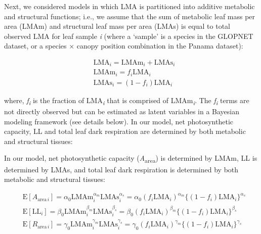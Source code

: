 \documentclass[
  12pt,
]{article}
\begin{document}
Next, we considered models in which LMA is partitioned into additive metabolic and structural functions; i.e., we assume that the sum of metabolic leaf mass per area (LMAm) and structural leaf mass per area (LMAs) is equal to total observed LMA for leaf sample \emph{i} (where a `sample' is a species in the GLOPNET dataset, or a species × canopy position combination in the Panama dataset):

\begin{align}
  &\mathrm{LMA}_{i} =\mathrm{LMAm}_{i} + \mathrm{LMAs}_{i} \label{eq:LMA}\\
  &\mathrm{LMAm}_{i} = f_{i} \mathrm{LMA}_{i} \label{eq:LMAm}\\
  &\mathrm{LMAs}_{i} = (1 - f_{i})  \mathrm{LMA}_{i}\label{eq:LMAs}
\end{align}

where, \emph{f\textsubscript{i}} is the fraction of LMA\textsubscript{\emph{i}} that is comprised of LMAm\textsubscript{\emph{i}}.
The \emph{f\textsubscript{i}} terms are not directly observed but can be estimated as latent variables in a Bayesian modeling framework (see details below).
In our model, net photosynthetic capacity, LL and total leaf dark respiration are determined by both metabolic and structural tissues:

In our model, net photosynthetic capacity (\emph{A}\textsubscript{area}) is determined by LMAm, LL is determined by LMAs, and total leaf dark respiration is determined by both metabolic and structural tissues:

\begin{align}
& \mathrm{E}[A_{\mathrm{area} \, i}]
= \alpha_0\mathrm{LMAm}_{i}^{\alpha_m}\mathrm{LMAs}_i^{\alpha_s}  =  \alpha_0 (f_i \mathrm{LMA}_{i})^{\alpha_m} \bigl\{(1-f_i) \mathrm{LMA}_{i}\bigr\}^{\alpha_s} \label{eq:E-A} \\
& \mathrm{E}[\mathrm{LL}_i] = \beta_0\mathrm{LMAm}_{i}^{\beta_m} \mathrm{LMAs}_{i}^{\beta_s}   = \beta_0 (f_i \mathrm{LMA}_{i})^{\beta_m} \bigl\{(1-f_i) \mathrm{LMA}_{i}\bigr\}^{\beta_s} \label{eq:E-LL} \\
& \mathrm{E}[R_{\mathrm{area} \, i}]
= \gamma_0\mathrm{LMAm}_{i}^{\gamma_m} \mathrm{LMAs}_{i}^{\gamma_s}
= \gamma_0 (f_i \mathrm{LMA}_{i})^{\gamma_m} \bigl\{(1-f_i)\mathrm{LMA}_{i}\bigr\}^{\gamma_s} \label{eq:E-R}
\end{align}
\end{document}
